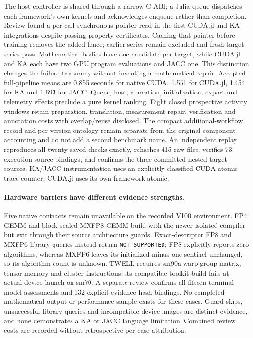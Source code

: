 The host controller is shared through a narrow C ABI; a Julia queue dispatches each framework's own kernels and acknowledges enqueue rather than completion. Review found a per-call synchronous pointer read in the first CUDA.jl and KA integrations despite passing property certificates. Caching that pointer before training removes the added fence; earlier series remain excluded and fresh target series pass. Mathematical bodies have one candidate per target, while CUDA.jl and KA each have two GPU program evaluations and JACC one. This distinction changes the failure taxonomy without inventing a mathematical repair. Accepted full-pipeline means are 0.855 seconds for native CUDA, 1.551 for CUDA.jl, 1.454 for KA and 1.693 for JACC. Queue, host, allocation, initialization, export and telemetry effects preclude a pure kernel ranking. Eight closed prospective activity windows retain preparation, translation, measurement repair, verification and annotation costs with overlap/reuse disclosed. The compact additional-workflow record and per-version ontology remain separate from the original component accounting and do not add a second benchmark name. An independent replay reproduces all twenty saved checks exactly, rehashes 415 raw files, verifies 73 execution-source bindings, and confirms the three committed nested target sources. KA/JACC instrumentation uses an explicitly classified CUDA atomic trace counter; CUDA.jl uses its own framework atomic.

\paragraph{Hardware barriers have different evidence strengths.}
Five native contracts remain unavailable on the recorded V100 environment. FP4 GEMM and block-scaled MXFP8 GEMM build with the newer isolated compiler but exit through their source architecture guards. Exact-descriptor FP8 and MXFP6 library queries instead return \texttt{NOT\_SUPPORTED}; FP8 explicitly reports zero algorithms, whereas MXFP6 leaves its initialized minus-one sentinel unchanged, so its algorithm count is unknown. TWELL requires sm90a warp-group matrix, tensor-memory and cluster instructions: its compatible-toolkit build fails at actual device launch on sm70. A separate review confirms all fifteen terminal model assessments and 132 explicit evidence hash bindings. No completed mathematical output or performance sample exists for these cases. Guard skips, unsuccessful library queries and incompatible device images are distinct evidence, and none demonstrates a KA or JACC language limitation. Combined review costs are recorded without retrospective per-case attribution.

